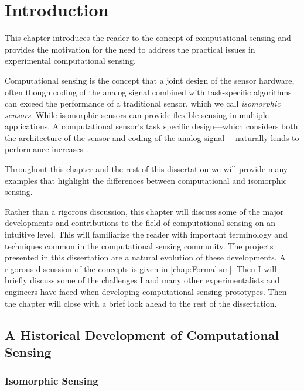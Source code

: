 

\chapter{Introduction}


This chapter introduces the reader to the concept of computational sensing and provides the motivation for the need to address the practical issues in experimental computational sensing. 

Computational sensing is the concept that a joint design of the sensor hardware, often though coding of the analog signal combined with task-specific algorithms can exceed the performance of a traditional sensor, which we call \emph{isomorphic sensors}. While isomorphic sensors can provide flexible sensing in multiple applications. A computational sensor's task specific design---which considers both the architecture of the sensor and coding of the analog signal ---naturally lends to performance increases \cite{neifeld2006taskSpecificSensing}. 

Throughout this chapter and the rest of this dissertation we will provide many examples that highlight the differences between computational and isomorphic sensing. 

Rather than a rigorous discussion, this chapter will discuss some of the major developments and contributions to the field of computational sensing on an intuitive level. This will familiarize the reader with important terminology and techniques common in the computational sensing community. The projects presented in this dissertation are a natural evolution of these developments. A rigorous discussion of the concepts is given in \autoref{chap:Formalism}. Then I will briefly discuss some of the challenges I and many other experimentalists and engineers have faced when developing computational sensing prototypes. Then the chapter will close with a brief look ahead to the rest of the dissertation. 


\section{A Historical Development of Computational Sensing}

\subsection{Isomorphic Sensing}


